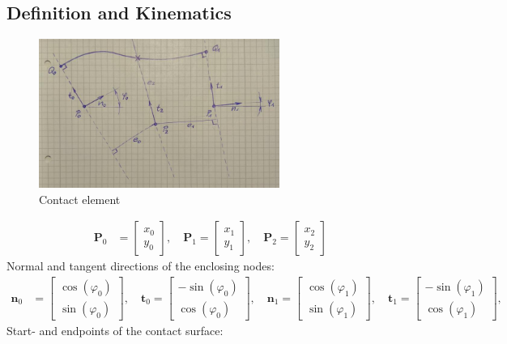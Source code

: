 \subsection{Definition and Kinematics}

\begin{figure}[h]
\centering
\includegraphics[width=0.7\textwidth]{figures/elements/contact_element_0}
\caption{Contact element}
\label{fig:contact_element}
\end{figure}

\begin{align*}
\boldsymbol{P}_0 &= \begin{bmatrix} x_0 \\ y_0 \end{bmatrix},\quad
\boldsymbol{P}_1 = \begin{bmatrix} x_1 \\ y_1 \end{bmatrix},\quad
\boldsymbol{P}_2 = \begin{bmatrix} x_2 \\ y_2 \end{bmatrix}
\end{align*}
%
Normal and tangent directions of the enclosing nodes:
%
\begin{align*}
\boldsymbol{n}_0 &= \begin{bmatrix}
\cos(\varphi_0) \\ \sin(\varphi_0)
\end{bmatrix},\quad
\boldsymbol{t}_0 = \begin{bmatrix}
-\sin(\varphi_0) \\ \cos(\varphi_0)
\end{bmatrix},\quad
\boldsymbol{n}_1 = \begin{bmatrix}
\cos(\varphi_1) \\ \sin(\varphi_1)
\end{bmatrix},\quad
\boldsymbol{t}_1 = \begin{bmatrix}
-\sin(\varphi_1) \\ \cos(\varphi_1)
\end{bmatrix},\quad
\end{align*}
%
Start- and endpoints of the contact surface:


